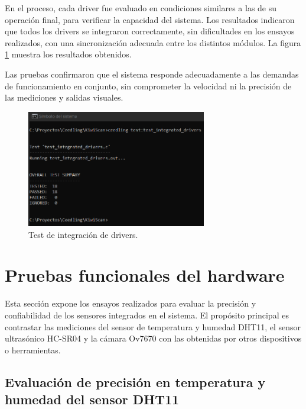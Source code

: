 En el proceso, cada driver fue evaluado en condiciones similares a las de su operación final, para verificar la capacidad del sistema. Los resultados indicaron que todos los drivers se integraron correctamente, sin dificultades en los ensayos realizados, con una sincronización adecuada entre los distintos módulos. La figura \ref{fig:test_integrated_drivers} muestra los resultados obtenidos.

Las pruebas confirmaron que el sistema responde adecuadamente a las demandas de funcionamiento en conjunto, sin comprometer la velocidad ni la precisión de las mediciones y salidas visuales.

\newpage

\vspace{1cm}

\begin{figure}[htbp]
	\centering
	\includegraphics[width=0.7\textwidth, height=0.3\textheight]{./Figures/test_integrated_drivers.png}
	\caption{Test de integración de drivers.}
	\label{fig:test_integrated_drivers}
\end{figure}

\vspace{1cm}

\section{Pruebas funcionales del hardware}
\label{pruebas_funcionales_hardware}

Esta sección expone los ensayos realizados para evaluar la precisión y confiabilidad de los sensores integrados en el sistema. El propósito principal es contrastar las mediciones del sensor de temperatura y humedad DHT11, el sensor ultrasónico HC-SR04 y la cámara Ov7670 con las obtenidas por otros dispositivos o herramientas.

\subsection{Evaluación de precisión en temperatura y humedad del sensor DHT11}

